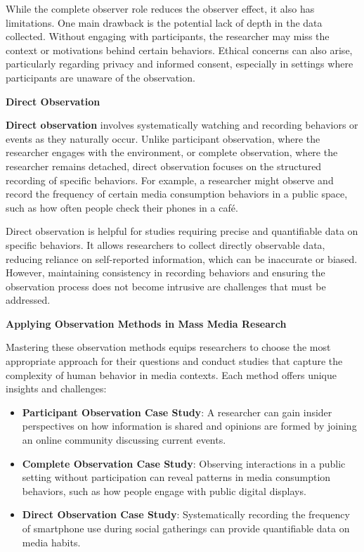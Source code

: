 \documentclass[
]{book}
\begin{document}
While the complete observer role reduces the observer effect, it also has limitations. One main drawback is the potential lack of depth in the data collected. Without engaging with participants, the researcher may miss the context or motivations behind certain behaviors. Ethical concerns can also arise, particularly regarding privacy and informed consent, especially in settings where participants are unaware of the observation.

\textbf{Direct Observation}

\textbf{Direct observation} involves systematically watching and recording behaviors or events as they naturally occur. Unlike participant observation, where the researcher engages with the environment, or complete observation, where the researcher remains detached, direct observation focuses on the structured recording of specific behaviors. For example, a researcher might observe and record the frequency of certain media consumption behaviors in a public space, such as how often people check their phones in a café.

Direct observation is helpful for studies requiring precise and quantifiable data on specific behaviors. It allows researchers to collect directly observable data, reducing reliance on self-reported information, which can be inaccurate or biased. However, maintaining consistency in recording behaviors and ensuring the observation process does not become intrusive are challenges that must be addressed.

\textbf{Applying Observation Methods in Mass Media Research}

Mastering these observation methods equips researchers to choose the most appropriate approach for their questions and conduct studies that capture the complexity of human behavior in media contexts. Each method offers unique insights and challenges:

\begin{itemize}
\item
  \textbf{Participant Observation Case Study}: A researcher can gain insider perspectives on how information is shared and opinions are formed by joining an online community discussing current events.
\item
  \textbf{Complete Observation Case Study}: Observing interactions in a public setting without participation can reveal patterns in media consumption behaviors, such as how people engage with public digital displays.
\item
  \textbf{Direct Observation Case Study}: Systematically recording the frequency of smartphone use during social gatherings can provide quantifiable data on media habits.
\end{itemize}
\end{document}
